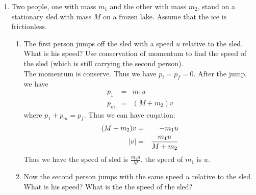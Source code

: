 \documentclass{article}
\newcommand{\de}{\mathrm{d}}
\begin{document}
\begin{enumerate}
\begin{enumerate}
    \end{enumerate}
    \item Two people, one with mass $m_1$ and the other with mass $m_2$, stand on a stationary sled with mass $M$ on a frozen lake. Assume that the ice is frictionless.
    \begin{enumerate}
        \item The first person jumps off the sled with a speed $u$ relative to the sled. What is his speed? Use conservation of momentum to find the speed of the sled (which is still carrying the second person).\\

        The momentum is conserve. Thus we have $p_i = p_f = 0$. After the jump, we have
        \begin{eqnarray*}
        p_1 &=& m_1 u \\ 
        p_m &=& (M + m_2) v
        \end{eqnarray*}
        where $p_1 + p_m = p_f$. Thus we can have euqation:
        \begin{eqnarray*}
        (M + m_2) v &=& - m_1 u \\ 
        \abs{v} &=& \frac{m_1 u}{M + m_2}
        \end{eqnarray*}
        Thus we have the speed of sled is $\frac{m_1 u}{M}$, the speed of $m_1$ is $u$.
        \item Now the second person jumps with the same speed $u$ relative to the sled. What is his speed? What is the the speed of the sled? \\


\end{enumerate}
\end{enumerate}
\end{document}

